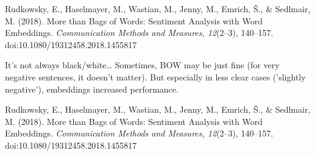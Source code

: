 \documentclass{beamer}
\begin{document}
\begin{frame}[plain]

\tiny{Rudkowsky, E., Haselmayer, M., Wastian, M., Jenny, M., Emrich, Š., \& Sedlmair, M. (2018). More than Bags of Words: Sentiment Analysis with Word Embeddings. \textit{Communication Methods and Measures, 12}(2–3), 140–157. doi:10.1080/19312458.2018.1455817}
\end{frame}


\begin{frame}{It's not always black/white\ldots}
Sometimes, BOW may be just fine (for very negative sentences, it doesn't matter). But especially in less clear cases ('slightly negative'), embeddings increased performance.

\vfill

\tiny{Rudkowsky, E., Haselmayer, M., Wastian, M., Jenny, M., Emrich, Š., \& Sedlmair, M. (2018). More than Bags of Words: Sentiment Analysis with Word Embeddings. \textit{Communication Methods and Measures, 12}(2–3), 140–157. doi:10.1080/19312458.2018.1455817}
\end{frame}
\end{document}

